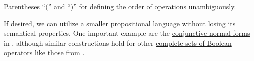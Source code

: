 \begin{definition}
\begin{thmenum}
     Parentheses \enquote{\( ( \)} and \enquote{\( ) \)} for defining the order of operations unambiguously.
  \end{thmenum}
\end{definition}
\begin{comments}
  \item If desired, we can utilize a smaller propositional language without losing its semantical properties. One important example are the \hyperref[def:cnf_and_dnf]{conjunctive normal forms} in , although similar constructions hold for other \hyperref[def:boolean_closure/complete]{complete sets of Boolean operators} like those from .
\end{comments}

